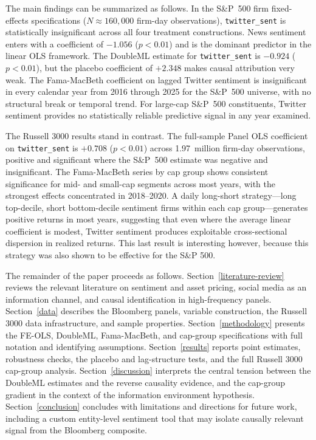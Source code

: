 The main findings can be summarized as follows. In the S\&P~500 firm
fixed-effects specifications (\(N \approx 160,000\) firm-day
observations), \texttt{twitter\_sent} is statistically insignificant
across all four treatment constructions. News sentiment enters with a
coefficient of \(- 1.056\) (\(p < 0.01\)) and is the dominant predictor
in the linear OLS framework. The DoubleML estimate for
\texttt{twitter\_sent} is \(- 0.924\) (\(p < 0.01\)), but the placebo
coefficient of \(+ 2.348\) makes causal attribution very weak. The
Fama-MacBeth coefficient on lagged Twitter sentiment is insignificant in
every calendar year from 2016 through 2025 for the S\&P~500 universe,
with no structural break or temporal trend. For large-cap S\&P~500
constituents, Twitter sentiment provides no statistically reliable
predictive signal in any year examined.

The Russell 3000 results stand in contrast. The full-sample Panel OLS
coefficient on \texttt{twitter\_sent} is \(+ 0.708\) (\(p < 0.01\))
across 1.97~million firm-day observations, positive and significant
where the S\&P~500 estimate was negative and insignificant. The
Fama-MacBeth series by cap group shows consistent significance for mid-
and small-cap segments across most years, with the strongest effects
concentrated in 2018--2020. A daily long-short strategy---long
top-decile, short bottom-decile sentiment firms within each cap
group---generates positive returns in most years, suggesting that even
where the average linear coefficient is modest, Twitter sentiment
produces exploitable cross-sectional dispersion in realized returns.
This last result is interesting however, because this strategy was also
shown to be effective for the S\&P 500.

The remainder of the paper proceeds as follows.
Section~\ref{literature-review} reviews the relevant
literature on sentiment and asset pricing, social media as an
information channel, and causal identification in high-frequency panels.
Section~\ref{data} describes the Bloomberg panels,
variable construction, the Russell 3000 data infrastructure, and sample
properties. Section~\ref{methodology} presents the
FE-OLS, DoubleML, Fama-MacBeth, and cap-group specifications with full
notation and identifying assumptions.
Section~\ref{results} reports point estimates,
robustness checks, the placebo and lag-structure tests, and the full
Russell 3000 cap-group analysis.
Section~\ref{discussion} interprets the central tension
between the DoubleML estimates and the reverse causality evidence, and
the cap-group gradient in the context of the information environment
hypothesis. Section~\ref{conclusion} concludes with
limitations and directions for future work, including a custom
entity-level sentiment tool that may isolate causally relevant signal
from the Bloomberg composite.
